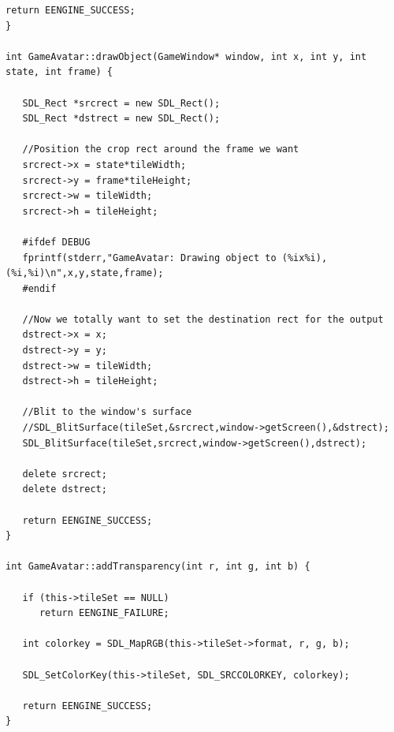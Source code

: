 \documentclass[12pt]{article}
\begin{document}
\begin{lstlisting}[breaklines]
   return EENGINE_SUCCESS;
}

int GameAvatar::drawObject(GameWindow* window, int x, int y, int state, int frame) {
   
   SDL_Rect *srcrect = new SDL_Rect();
   SDL_Rect *dstrect = new SDL_Rect();
   
   //Position the crop rect around the frame we want
   srcrect->x = state*tileWidth;
   srcrect->y = frame*tileHeight;
   srcrect->w = tileWidth;
   srcrect->h = tileHeight;
   
   #ifdef DEBUG
   fprintf(stderr,"GameAvatar: Drawing object to (%ix%i),(%i,%i)\n",x,y,state,frame);
   #endif

   //Now we totally want to set the destination rect for the output
   dstrect->x = x;
   dstrect->y = y;
   dstrect->w = tileWidth;
   dstrect->h = tileHeight;
   
   //Blit to the window's surface
   //SDL_BlitSurface(tileSet,&srcrect,window->getScreen(),&dstrect);
   SDL_BlitSurface(tileSet,srcrect,window->getScreen(),dstrect);
   
   delete srcrect;
   delete dstrect;
   
   return EENGINE_SUCCESS;
}

int GameAvatar::addTransparency(int r, int g, int b) {
   
   if (this->tileSet == NULL)
      return EENGINE_FAILURE;
   
   int colorkey = SDL_MapRGB(this->tileSet->format, r, g, b);
   
   SDL_SetColorKey(this->tileSet, SDL_SRCCOLORKEY, colorkey);
   
   return EENGINE_SUCCESS;
}
\end{lstlisting}
\end{document}
